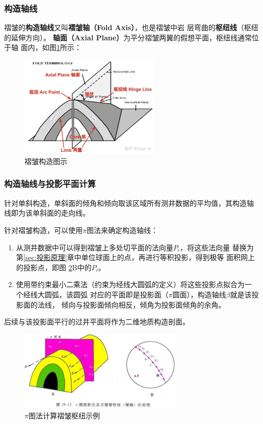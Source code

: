 \documentclass[a4paper,twoside]{ctexart}
\begin{document}
\subsubsection{构造轴线}

褶皱的\textbf{构造轴线}又叫\textbf{褶皱轴（Fold Axis）}，也是褶皱中岩
层弯曲的\textbf{枢纽线}（枢纽的延伸方向）。
\textbf{轴面（Axial Plane）}为平分褶皱两翼的假想平面，枢纽线通常位于轴
面内，如图\ref{fig:褶皱构造图示}所示：

\begin{figure}[htbp]
  \centering
    \includegraphics[width=0.6\textwidth]{pic/褶皱构造图示.png}
  \caption{褶皱构造图示}
  \label{fig:褶皱构造图示}
\end{figure}

\subsubsection{构造轴线与投影平面计算}
\label{sec:构造轴线与投影平面计算}

针对单斜构造，单斜面的倾角和倾向取该区域所有测井数据的平均值，其构造轴
线即为该单斜面的走向线。

针对褶皱构造，可以使用$\pi$图法来确定构造轴线：
\begin{enumerate}
\item 从测井数据中可以得到褶皱上多处切平面的法向量$P_i$，将这些法向量
  替换为
  第\ref{sec:投影原理}章中单位球面上的点，再进行等积投影，得到极等
  面积网上的投影点，即图 \ref{fig:图解法求褶皱枢纽}B中的$P_i$。 
\item 使用带约束最小二乘法（约束为经线大圆弧的定义）将这些投影点拟合为一
  个经线大圆弧，该圆弧
  对应的平面即是投影面（$\pi$圆面），构造轴线$\beta$就是该投影面的法线，
  倾向与投影面倾向相反，倾角为投影面倾角的余角。
\end{enumerate}

后续与该投影面平行的过井平面将作为二维地质构造剖面。
 \begin{figure}[htbp]
  \centering
    \includegraphics[width=0.7\textwidth]{pic/图解法求褶皱枢纽.png}
  \caption{$\pi$图法计算褶皱枢纽示例}
  \label{fig:图解法求褶皱枢纽}
\end{figure}
\end{document}
